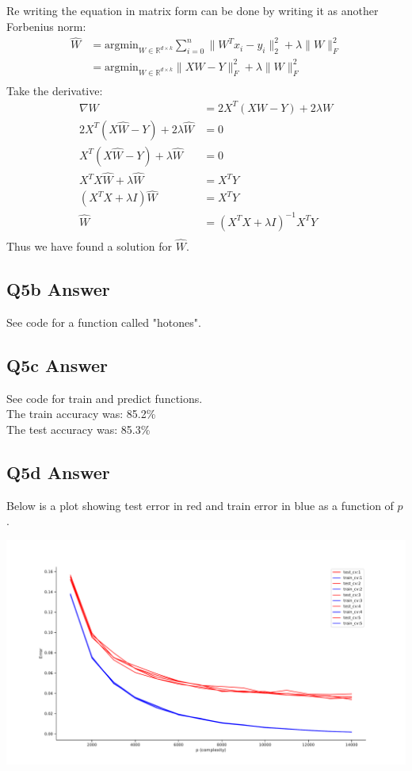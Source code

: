 \documentclass{article}
\newcommand{\1}{\mathbf{1}}
\def\R{\mathbb{R}}
\begin{document}
Re writing the equation in matrix form can be done by writing it as another Forbenius norm:
\begin{align*}
\widehat{W} & = \text{argmin}_{W \in \R^{d \times k}} \sum_{i=0}^{n} \| W^Tx_{i} - y_{i} \|^{2}_{2} + \lambda \|W\|_{F}^{2} \\
& = \text{argmin}_{W \in \R^{d \times k}} \| X W - Y \|_F^2 + \lambda \|W\|_F^2 \\
\end{align*}
Take the derivative:
\begin{align*}
    \nabla{W} & = 2 X^T(X W -Y) + 2 \lambda W \\
    2 X^T(X\widehat{W} -Y) + 2 \lambda \widehat{W} & = 0 \\
    X^T(X\widehat{W} -Y) + \lambda \widehat{W} & = 0 \\
    X^TX\widehat{W} + \lambda \widehat{W} & = X^T Y \\
    (X^TX + \lambda I ) \widehat{W} & = X^T Y \\
     \widehat{W} & =(X^TX + \lambda I )^{-1} X^T Y \\
\end{align*}
Thus we have found a solution for $\widehat{W}$. \\

\subsection{Q5b Answer}
See code for a function called "hotones". 

\subsection{Q5c Answer}
See code for train and predict functions. \\
The train accuracy was: 85.2\% \\
The test accuracy was: 85.3\% \\

\subsection{Q5d Answer}
Below is a plot showing test error in red and train error in blue as a function of $p$. 
\begin{center}
    \includegraphics[width=\textwidth]{hw1/P3.pdf}
\end{center}
\end{document}
